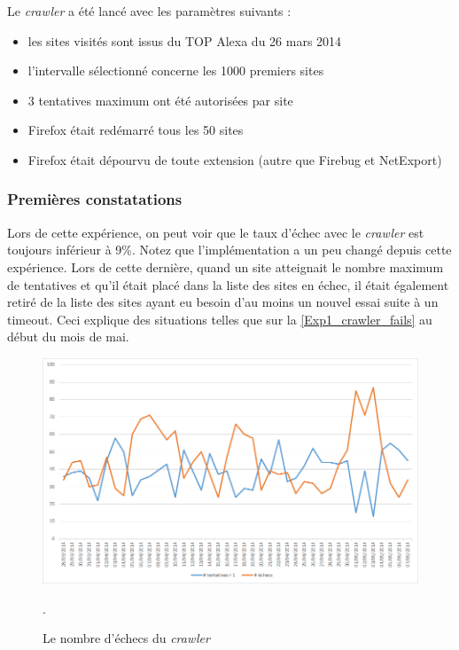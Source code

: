 Le \textit{crawler} a été lancé avec les paramètres suivants :
\begin{itemize}
	\item les sites visités sont issus du TOP Alexa du 26 mars 2014
	\item l'intervalle sélectionné concerne les 1000 premiers sites
	\item 3 tentatives maximum ont été autorisées par site
	\item Firefox était redémarré tous les 50 sites
	\item Firefox était dépourvu de toute extension (autre que Firebug et NetExport)
	\newline
\end{itemize}

\subsubsection{Premières constatations}
Lors de cette expérience, on peut voir que le taux d'échec avec le \textit{crawler} est toujours inférieur à 9\%.
Notez que l'implémentation a un peu changé depuis cette expérience. Lors de cette dernière, quand un site atteignait le nombre maximum de tentatives et qu'il était placé dans la liste des sites en échec, il était également retiré de la liste des sites ayant eu besoin d'au moins un nouvel essai suite à un timeout.
Ceci explique des situations telles que sur la \autoref{Exp1_crawler_fails} au début du mois de mai.

\begin{figure}[h]
	\centering
	\includegraphics[scale=.7]{graphiques/Exp1_crawler_fails.png}
	\caption{\label{Exp1_crawler_fails}Le nombre d'échecs du \textit{crawler}}.
\end{figure}

